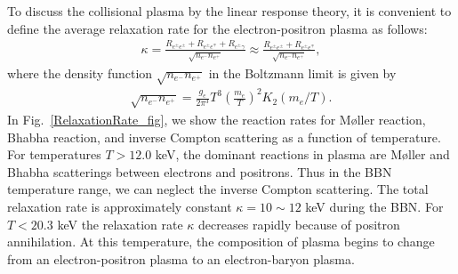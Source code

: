 To discuss the collisional plasma by the linear response theory, it is convenient to define the average relaxation rate for the electron-positron plasma as follows:
\begin{align}\label{Kappa}
\kappa=\frac{R_{e^\pm e^\pm}+R_{e^\pm e^\mp}+R_{e^\pm\gamma}}{\sqrt{n_{e^-}n_{e^+}}}\approx\frac{R_{e^\pm e^\pm}+R_{e^\pm e^\mp}}{\sqrt{n_{e^-}n_{e^+}}},
\end{align}
where the density function ${\sqrt{n_{e^-}n_{e^+}}}$ in the Boltzmann limit is given by
\begin{align}
{\sqrt{n_{e^-}n_{e^+}}}=\frac{g_e}{2\pi^3}T^3\left(\frac{m_e}{T}\right)^2K_2(m_e/T).
\end{align}
In Fig.~\ref{RelaxationRate_fig}, we show the reaction rates for M{\o}ller reaction, Bhabha reaction, and inverse Compton scattering as a function of temperature. For temperatures $T>12.0$ keV, the dominant reactions in plasma are M{\o}ller and Bhabha scatterings between electrons and positrons. Thus in the BBN temperature range, we can neglect the inverse Compton scattering. The total relaxation rate is approximately constant $\kappa=10\sim12$ keV during the BBN. For $T<20.3$ keV the relaxation rate $\kappa$ decreases rapidly because of positron annihilation. At this temperature, the composition of plasma begins to change from an electron-positron plasma to an electron-baryon plasma.
